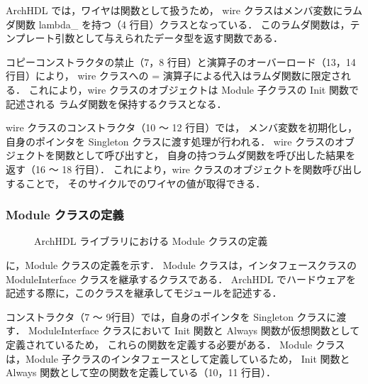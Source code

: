ArchHDL では，ワイヤは関数として扱うため，
wire クラスはメンバ変数にラムダ関数 lambda\_ を持つ（4 行目）クラスとなっている．
このラムダ関数は，テンプレート引数として与えられたデータ型を返す関数である．

コピーコンストラクタの禁止（7，8 行目）と演算子のオーバーロード（13，14 行目）により，
wire クラスへの = 演算子による代入はラムダ関数に限定される．
これにより，wire クラスのオブジェクトは Module 子クラスの Init 関数で記述される
ラムダ関数を保持するクラスとなる．

wire クラスのコンストラクタ（10 ～ 12 行目）では，
メンバ変数を初期化し，自身のポインタを Singleton クラスに渡す処理が行われる．
wire クラスのオブジェクトを関数として呼び出すと，
自身の持つラムダ関数を呼び出した結果を返す（16 ～ 18 行目）．
これにより，wire クラスのオブジェクトを関数呼び出しすることで，
そのサイクルでのワイヤの値が取得できる．

\subsubsection{Module クラスの定義}

\begin{figure}[t]
 
 \caption{ArchHDL ライブラリにおける Module クラスの定義}
 \label{src:module}
\end{figure}

 に，Module クラスの定義を示す．
Module クラスは，インタフェースクラスの ModuleInterface クラスを継承するクラスである．
ArchHDL でハードウェアを記述する際に，このクラスを継承してモジュールを記述する．

コンストラクタ（7 ～ 9行目）では，自身のポインタを Singleton クラスに渡す．
ModuleInterface クラスにおいて Init 関数と Always 関数が仮想関数として定義されているため，
これらの関数を定義する必要がある．
Module クラスは，Module 子クラスのインタフェースとして定義しているため，
Init 関数と Always 関数として空の関数を定義している（10，11 行目）．
